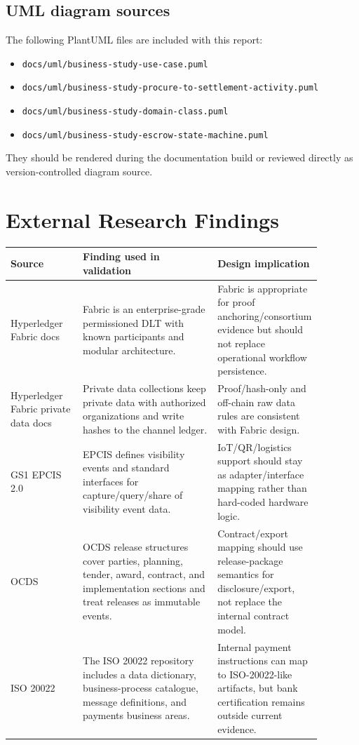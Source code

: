 \documentclass[11pt,a4paper]{article}
\newcommand{\repo}[1]{\texttt{#1}}
\begin{document}
\subsection{UML diagram sources}

The following PlantUML files are included with this report:

\begin{itemize}
  \item \repo{docs/uml/business-study-use-case.puml}
  \item \repo{docs/uml/business-study-procure-to-settlement-activity.puml}
  \item \repo{docs/uml/business-study-domain-class.puml}
  \item \repo{docs/uml/business-study-escrow-state-machine.puml}
\end{itemize}

They should be rendered during the documentation build or reviewed directly as version-controlled diagram source.

\section{External Research Findings}

\begin{longtable}{P{0.24\linewidth}P{0.46\linewidth}P{0.18\linewidth}}
\toprule
Source & Finding used in validation & Design implication \\
\midrule
Hyperledger Fabric docs & Fabric is an enterprise-grade permissioned DLT with known participants and modular architecture. & Fabric is appropriate for proof anchoring/consortium evidence but should not replace operational workflow persistence. \\
Hyperledger Fabric private data docs & Private data collections keep private data with authorized organizations and write hashes to the channel ledger. & Proof/hash-only and off-chain raw data rules are consistent with Fabric design. \\
GS1 EPCIS 2.0 & EPCIS defines visibility events and standard interfaces for capture/query/share of visibility event data. & IoT/QR/logistics support should stay as adapter/interface mapping rather than hard-coded hardware logic. \\
OCDS & OCDS release structures cover parties, planning, tender, award, contract, and implementation sections and treat releases as immutable events. & Contract/export mapping should use release-package semantics for disclosure/export, not replace the internal contract model. \\
ISO 20022 & The ISO 20022 repository includes a data dictionary, business-process catalogue, message definitions, and payments business areas. & Internal payment instructions can map to ISO-20022-like artifacts, but bank certification remains outside current evidence. \\
\bottomrule
\end{longtable}
\end{document}
